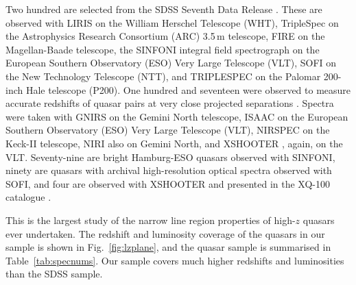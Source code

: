 Two hundred are selected from the SDSS Seventh Data Release \citep[DR7;][]{schneider10}. 
These are observed with LIRIS \citep{manchado98} on the William Herschel Telescope (WHT), TripleSpec \citep{wilson04} on the Astrophysics Research Consortium (ARC) 3.5\,m telescope, FIRE \citep{simcoe10} on the Magellan-Baade telescope, the SINFONI integral field spectrograph \citep{eisenhauer03,bonnet04} on the European Southern Observatory (ESO) Very Large Telescope (VLT), SOFI \citep{moorwood98a} on the New Technology Telescope (NTT), and TRIPLESPEC on the Palomar 200-inch Hale telescope (P200).
One hundred and seventeen were observed to measure accurate redshifts of quasar pairs at very close projected separations \citep{prochaska09,lau15,hennawi15}. 
Spectra were taken with GNIRS \citep{elias06} on the Gemini North telescope, ISAAC \citep{moorwood98b} on the European Southern Observatory (ESO) Very Large Telescope (VLT), NIRSPEC \citep{mclean98} on the Keck-II telescope, NIRI \citep{hodapp03} also on Gemini North, and XSHOOTER \citep{vernet11}, again, on the VLT.
Seventy-nine are bright Hamburg-ESO quasars observed with SINFONI, ninety are quasars with archival high-resolution optical spectra observed with SOFI, and four are observed with XSHOOTER and presented in the XQ-100 catalogue \citep{lopez16}.

This is the largest study of the narrow line region properties of high-$z$ quasars ever undertaken. 
The redshift and luminosity coverage of the quasars in our sample is shown in Fig.~\ref{fig:lzplane}, and the quasar sample is summarised in Table~\ref{tab:specnums}.
Our sample covers much higher redshifts and luminosities than the SDSS sample.  

